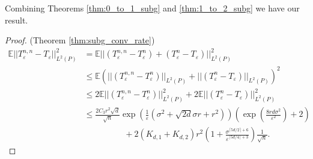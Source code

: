 \documentclass{article}
\theoremstyle{definition}
\newcommand{\Teps}{T_\varepsilon}
\begin{document}
Combining Theorems \ref{thm:0_to_1_subg} and \ref{thm:1_to_2_subg} we have our result.
\begin{proof} (Theorem \ref{thm:subg_conv_rate})
    \noindent \begin{align}
        \mathbb{E} ||\Teps^{n,n} - \Teps||_{L^2(P)}^2 &= \mathbb{E} ||(\Teps^{n,n} - \Teps^n) + (\Teps^n - \Teps)||_{L^2(P)}^2 \nonumber \\
        &\leq \mathbb{E} \left ( ||(\Teps^{n,n} - \Teps^n)||_{L^2(P)} + ||(\Teps^n - \Teps)||_{L^2(P)} \right )^2 \nonumber \\
        &\leq 2\mathbb{E}||(\Teps^{n,n} - \Teps^n)||_{L^2(P)}^2 + 2\mathbb{E}||(\Teps^n - \Teps)||_{L^2(P)}^2 \nonumber \\
        &\leq \frac{2C_3r^2\sqrt{d}}{\sqrt{n}}
         \exp \left (
            \frac{1}{\varepsilon} 
            \left (  \sigma^2 + \sqrt{2 d} \sigma r + r^2 \right ) \right ) \left ( \exp \left ( \frac{8rd\sigma^2}{\varepsilon^2}\right ) + 2 \right )  \nonumber \\
        & \hspace{2cm} + 2(K_{d,1}+K_{d,2})r^2 \left ( 1 + \frac{\sigma^{\lceil 5d / 2 \rceil + 6}}{\varepsilon^{\lceil 5d/4 \rceil + 3}} \right )\frac{1}{\sqrt{n}}. \label{eq:b1_expression}
    \end{align}
\end{proof}
\end{document}
